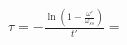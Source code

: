 \documentclass[preview]{standalone}
\begin{document}
\begin{center}
$\tau=-\frac{\ln\left(1-\frac{\omega'}{\omega_{ss}}\right)}{t'}=$
\end{center}
\end{document}
